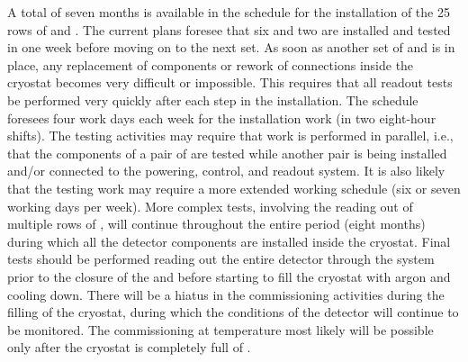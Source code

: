A total of seven months is available in the schedule for the installation
of the \num{25} rows of  and . The current plans foresee that six 
and two  are installed and
tested in one week before moving on to the next set. As soon as another
set of  and  is in place, any replacement of components or rework
of connections inside the cryostat becomes very difficult or impossible.
This requires that all readout tests be performed very quickly after
each step in the installation. The schedule foresees four work days each
week for the installation work (in two eight-hour shifts). The testing
activities may require that work is performed in parallel, i.e., that
the  components of a pair of  are tested while another pair is
being installed and/or connected to the powering, control, and readout
system. It is also likely that the testing work may require a more
extended working schedule (six or seven working days per week). More
complex tests, involving the reading out of multiple rows of , will continue
throughout the entire period (eight months) during which all the detector
components are installed inside the cryostat. Final tests should be
performed reading out the entire detector through the  system
prior to the closure of the  and before
starting to fill the cryostat with argon and cooling down. There will be a hiatus
in the commissioning activities during the filling of the cryostat, during
which the conditions of the detector will continue to be monitored. The
commissioning at \lar temperature most likely will be possible only
after the cryostat is completely full of \lar.
